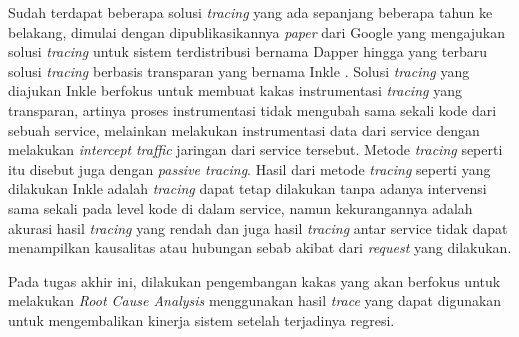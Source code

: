   Sudah terdapat beberapa solusi \textit{tracing} yang ada sepanjang beberapa tahun ke belakang, dimulai dengan dipublikasikannya \textit{paper} dari Google yang mengajukan solusi \textit{tracing} untuk sistem terdistribusi bernama Dapper \citep{dapper-paper} hingga yang terbaru solusi \textit{tracing} berbasis transparan yang bernama Inkle \citep{tracing-abram}. Solusi \textit{tracing} yang diajukan Inkle berfokus untuk membuat kakas instrumentasi \textit{tracing} yang transparan, artinya proses instrumentasi tidak mengubah sama sekali kode dari sebuah service, melainkan melakukan instrumentasi data dari service dengan melakukan \textit{intercept} \textit{traffic} jaringan dari service tersebut. Metode \textit{tracing} seperti itu disebut juga dengan \textit{passive tracing}. Hasil dari metode \textit{tracing} seperti yang dilakukan Inkle adalah \textit{tracing} dapat tetap dilakukan tanpa adanya intervensi sama sekali pada level kode di dalam service, namun kekurangannya adalah akurasi hasil \textit{tracing} yang rendah dan juga hasil \textit{tracing} antar service tidak dapat menampilkan kausalitas atau hubungan sebab akibat dari \textit{request} yang dilakukan.
  
  Pada tugas akhir ini, dilakukan pengembangan kakas yang akan berfokus untuk melakukan \textit{Root Cause Analysis} menggunakan hasil \textit{trace} yang dapat digunakan untuk mengembalikan kinerja sistem setelah terjadinya regresi. 




